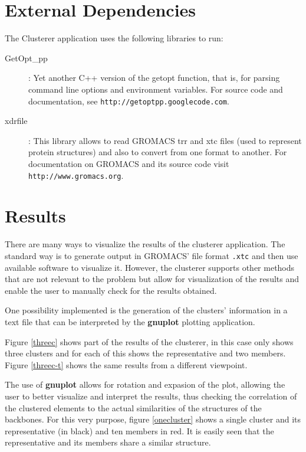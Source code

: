 \documentclass[a4paper,12pt,english]{report}
\begin{document}
\section{External Dependencies}

The Clusterer application uses the following libraries to run:
\begin{description}
\item[GetOpt\_pp]: Yet another C++ version of the getopt function, that is, for parsing command line options and environment variables. For source code and documentation, see \texttt{http://getoptpp.googlecode.com}.
\item[xdrfile]: This library allows to read GROMACS trr and xtc files (used to represent protein structures) and also to convert from one format to another. For documentation on GROMACS and its source code visit \texttt{http://www.gromacs.org}.
\end{description}

\section{Results}

There are many ways to visualize the results of the clusterer application. The standard way is to generate output in GROMACS' file format \texttt{.xtc} and then use available software to visualize it. However, the clusterer supports other methods that are not relevant to the problem but allow for visualization of the results and enable the user to manually check for the results obtained.

One possibility implemented is the generation of the clusters' information in a text file that can be interpreted by the \textbf{gnuplot} plotting application. 

Figure \ref{threec} shows part of the results of the clusterer, in this case only shows three clusters and for each of this shows the representative and two members. Figure \ref{threec-t} shows the same results from a different viewpoint. 

The use of \textbf{gnuplot} allows for rotation and expasion of the plot, allowing the user to better visualize and interpret the results, thus checking the correlation of the clustered elements to the actual similarities of the structures of the backbones. For this very purpose, figure \ref{onecluster} shows a single cluster and its representative (in black) and ten members in red. It is easily seen that the representative and its members share a similar structure.
\end{document}
